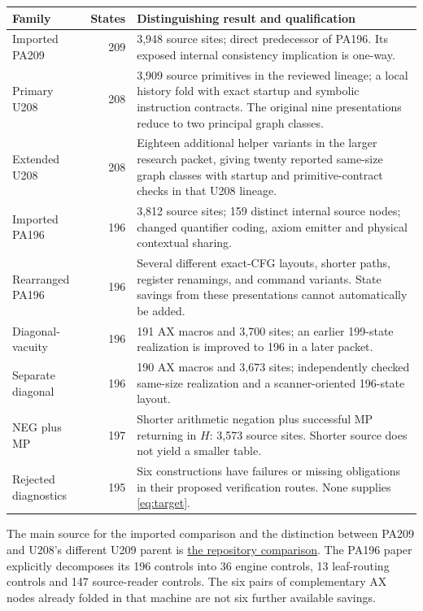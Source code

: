 \documentclass[10pt,letterpaper]{article}
\newcommand{\repo}{https://github.com/VladimirReshetnikov/ProveIt}
\newcommand{\pin}{906367250a7f96c923147b10df392294bced7be5}
\newcommand{\src}[2]{\href{\repo/blob/\pin/#1}{#2}}
\begin{document}
\begin{center}\small
\begin{tabular}{@{}p{2.4cm}rp{8.7cm}@{}}
\toprule
Family & States & Distinguishing result and qualification\\\midrule
Imported PA209 &209&3,948 source sites; direct predecessor of PA196. Its exposed
internal consistency implication is one-way.\\
Primary U208 &208&3,909 source primitives in the reviewed lineage; a local
history fold with exact startup and symbolic instruction contracts. The original
nine presentations reduce to two principal graph classes.\\
Extended U208 &208&Eighteen additional helper variants in the larger research
packet, giving twenty reported same-size graph classes with startup and
primitive-contract checks in that U208 lineage.\\
Imported PA196 &196&3,812 source sites; 159 distinct internal source nodes;
changed quantifier coding, axiom emitter and physical contextual sharing.\\
Rearranged PA196 &196&Several different exact-CFG layouts, shorter paths,
register renamings, and command variants. State savings from these presentations
cannot automatically be added.\\
Diagonal-vacuity &196&191 AX macros and 3,700 sites; an earlier 199-state
realization is improved to 196 in a later packet.\\
Separate diagonal &196&190 AX macros and 3,673 sites; independently checked
same-size realization and a scanner-oriented 196-state layout.\\
NEG plus MP &197&Shorter arithmetic negation plus successful MP returning in
$H$: 3,573 source sites. Shorter source does not yield a smaller table.\\
Rejected diagnostics &195&Six constructions have failures or missing obligations
in their proposed verification routes. None supplies \eqref{eq:target}.\\
\bottomrule
\end{tabular}\end{center}

The main source for the imported comparison and the distinction between PA209
and U208's different U209 parent is
\src{Computability/BusyBeaver/Research/PA/pa196-vs-u208/COMPARISON.md}{the repository comparison}.
The PA196 paper explicitly decomposes its 196 controls into 36 engine controls,
13 leaf-routing controls and 147 source-reader controls. The six pairs of
complementary AX nodes already folded in that machine are not six further
available savings.
\end{document}
